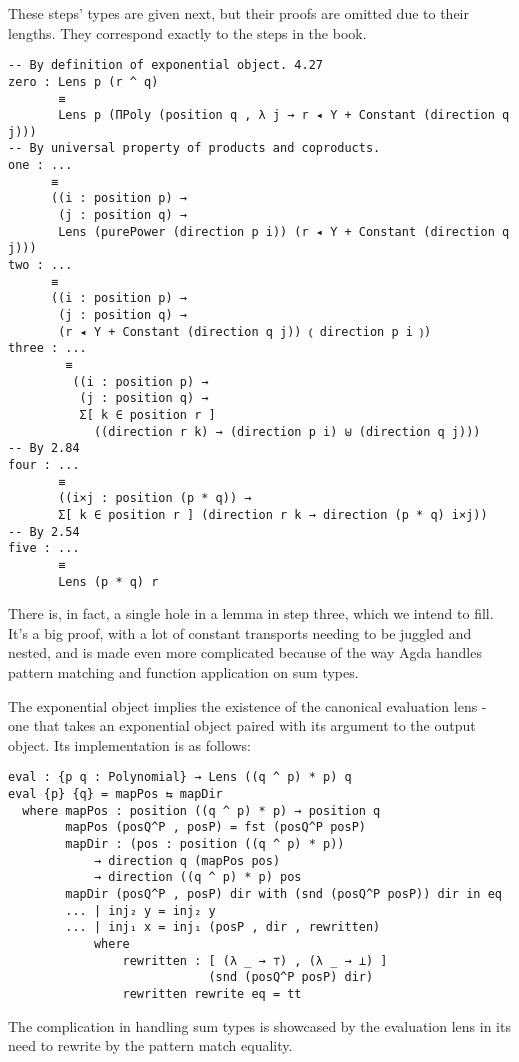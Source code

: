 These steps' types are given next, but their proofs are omitted due to their lengths. They correspond exactly to the steps in the book.
\begin{verbatim}
-- By definition of exponential object. 4.27
zero : Lens p (r ^ q)
       ≡ 
       Lens p (ΠPoly (position q , λ j → r ◂ Y + Constant (direction q j)))
-- By universal property of products and coproducts.  
one : ...
      ≡ 
      ((i : position p) →
       (j : position q) → 
       Lens (purePower (direction p i)) (r ◂ Y + Constant (direction q j)))
two : ...
      ≡ 
      ((i : position p) →
       (j : position q) → 
       (r ◂ Y + Constant (direction q j)) ⦅ direction p i ⦆)
three : ...
        ≡
         ((i : position p) →
          (j : position q) → 
          Σ[ k ∈ position r ] 
            ((direction r k) → (direction p i) ⊎ (direction q j)))
-- By 2.84
four : ... 
       ≡
       ((i×j : position (p * q)) → 
       Σ[ k ∈ position r ] (direction r k → direction (p * q) i×j))
-- By 2.54
five : ...
       ≡
       Lens (p * q) r
\end{verbatim}

There is, in fact, a single hole in a lemma in step three, which we intend to fill. It's a big proof, with a lot of constant transports needing to be juggled and nested, and is made even more complicated because of the way Agda handles pattern matching and function application on sum types.

The exponential object implies the existence of the canonical evaluation lens - one that takes an exponential object paired with its argument to the output object. Its implementation is as follows:

\begin{verbatim}
eval : {p q : Polynomial} → Lens ((q ^ p) * p) q
eval {p} {q} = mapPos ⇆ mapDir
  where mapPos : position ((q ^ p) * p) → position q
        mapPos (posQ^P , posP) = fst (posQ^P posP)
        mapDir : (pos : position ((q ^ p) * p))
            → direction q (mapPos pos) 
            → direction ((q ^ p) * p) pos
        mapDir (posQ^P , posP) dir with (snd (posQ^P posP)) dir in eq
        ... | inj₂ y = inj₂ y
        ... | inj₁ x = inj₁ (posP , dir , rewritten)
            where
                rewritten : [ (λ _ → ⊤) , (λ _ → ⊥) ]
                            (snd (posQ^P posP) dir)
                rewritten rewrite eq = tt
\end{verbatim}

The complication in handling sum types is showcased by the evaluation lens in its need to rewrite by the pattern match equality.

